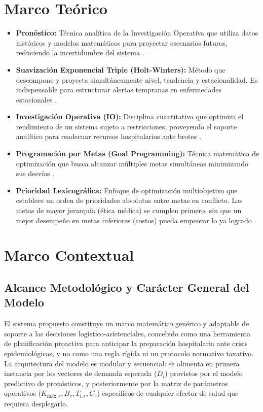 \documentclass[conference]{IEEEtran}
\begin{document}
\section{Marco Teórico}
\begin{itemize}
    \item \textbf{Pronóstico:} Técnica analítica de la Investigación Operativa que utiliza datos históricos y modelos matemáticos para proyectar escenarios futuros, reduciendo la incertidumbre del sistema \cite{ref7, ref11}.
    \item \textbf{Suavización Exponencial Triple (Holt-Winters):} Método que descompone y proyecta simultáneamente nivel, tendencia y estacionalidad. Es indispensable para estructurar alertas tempranas en enfermedades estacionales \cite{ref9}.
    \item \textbf{Investigación Operativa (IO):} Disciplina cuantitativa que optimiza el rendimiento de un sistema sujeto a restricciones, proveyendo el soporte analítico para readecuar recursos hospitalarios ante brotes \cite{ref10}.
    \item \textbf{Programación por Metas (Goal Programming):} Técnica matemática de optimización que busca alcanzar múltiples metas simultáneas minimizando sus desvíos \cite{ref8}.
    \item \textbf{Prioridad Lexicográfica:} Enfoque de optimización multiobjetivo que establece un orden de prioridades absolutas entre metas en conflicto. Las metas de mayor jerarquía (ética médica) se cumplen primero, sin que un mejor desempeño en metas inferiores (costos) pueda empeorar lo ya logrado \cite{ref11, refGP}.
\end{itemize}


\section{Marco Contextual}
\subsection{Alcance Metodológico y Carácter General del Modelo}
El sistema propuesto constituye un marco matemático genérico y adaptable de soporte a las decisiones logístico-asistenciales, concebido como una herramienta de planificación proactiva para anticipar la preparación hospitalaria ante crisis epidemiológicas, y no como una regla rígida ni un protocolo normativo taxativo. La arquitectura del modelo es modular y secuencial: se alimenta en primera instancia por los vectores de demanda esperada ($D_i$) provistos por el modelo predictivo de pronósticos, y posteriormente por la matriz de parámetros operativos ($K_{\text{max},r}, B_r, T_{i,r}, C_r$) específicos de cualquier efector de salud que requiera desplegarlo.
\end{document}
